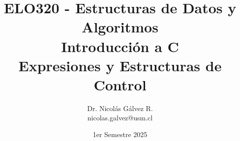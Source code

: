 \documentclass{beamer}
\title{ELO320 - Estructuras de Datos y Algoritmos\\Introducción a C\\Expresiones y Estructuras de Control}
\author{Dr. Nicolás Gálvez R.\\{\small nicolas.galvez@usm.cl}}
\institute{Ing. Civil Telemática - Departamento de Electrónica}
\date{1er Semestre 2025}
\begin{document}
\frame{\titlepage}

%
%

%
%
%
\end{document}
